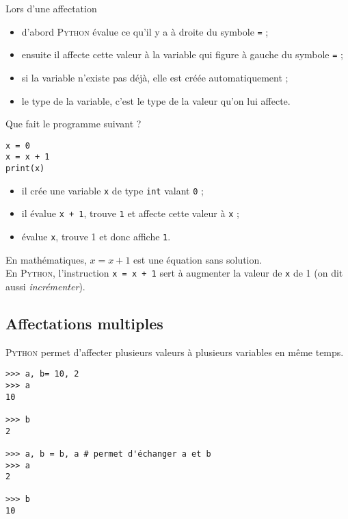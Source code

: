\begin{definition}[ : affectation]
Lors d'une affectation
\begin{itemize}
	\item d'abord \textsc{Python} évalue ce qu'il y a à droite du symbole \texttt{=} ;
	\item ensuite il affecte cette valeur à la variable qui figure à gauche du symbole \texttt{=} ;
	\item si la variable n'existe pas déjà, elle est créée automatiquement ;
	\item le type de la variable, c'est le type de la valeur qu'on lui affecte. 
\end{itemize}
\end{definition}
Que fait le programme suivant ?

\begin{pyc}
\begin{verbatim}
x = 0
x = x + 1
print(x)    
\end{verbatim}
\end{pyc}

\begin{itemize}
	\item il crée une variable \texttt{x} de type \texttt{int} valant \texttt{0} ;
	\item il évalue \texttt{x + 1}, trouve \texttt{1} et affecte cette valeur à \texttt{x} ;
	\item évalue \texttt{x}, trouve 1 et donc affiche \texttt{1}.
\end{itemize}

\begin{aretenir}
En mathématiques, $x = x + 1$ est une équation sans solution.\\

En \textsc{Python}, l'instruction \texttt{x = x + 1} sert à augmenter la valeur de \texttt{x} de 1 (on dit aussi \textit{incrémenter}).
\end{aretenir}

\subsection{Affectations multiples}
\textsc{Python} permet d'affecter plusieurs valeurs à plusieurs variables en même temps.

\begin{pys}\begin{verbatim}
>>> a, b= 10, 2
>>> a
10

>>> b
2

>>> a, b = b, a # permet d'échanger a et b
>>> a
2

>>> b
10

\end{verbatim}
\end{pys}

